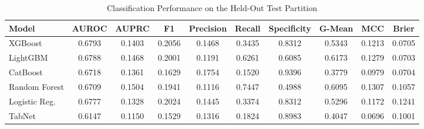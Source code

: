 \begin{table}
\centering
\caption{Classification Performance on the Held-Out Test Partition}
\label{tab:results}
\begin{tabular}{lccccccccc}
\toprule
Model & AUROC & AUPRC & F1 & Precision & Recall & Specificity & G-Mean & MCC & Brier \\
\midrule
XGBoost & 0.6793 & 0.1403 & 0.2056 & 0.1468 & 0.3435 & 0.8312 & 0.5343 & 0.1213 & 0.0705 \\
LightGBM & 0.6788 & 0.1468 & 0.2001 & 0.1191 & 0.6261 & 0.6085 & 0.6173 & 0.1279 & 0.0703 \\
CatBoost & 0.6718 & 0.1361 & 0.1629 & 0.1754 & 0.1520 & 0.9396 & 0.3779 & 0.0979 & 0.0704 \\
Random Forest & 0.6709 & 0.1504 & 0.1941 & 0.1116 & 0.7447 & 0.4988 & 0.6095 & 0.1307 & 0.1057 \\
Logistic Reg. & 0.6777 & 0.1328 & 0.2024 & 0.1445 & 0.3374 & 0.8312 & 0.5296 & 0.1172 & 0.1241 \\
TabNet & 0.6147 & 0.1150 & 0.1529 & 0.1316 & 0.1824 & 0.8983 & 0.4047 & 0.0696 & 0.1001 \\
\bottomrule
\end{tabular}
\end{table}
